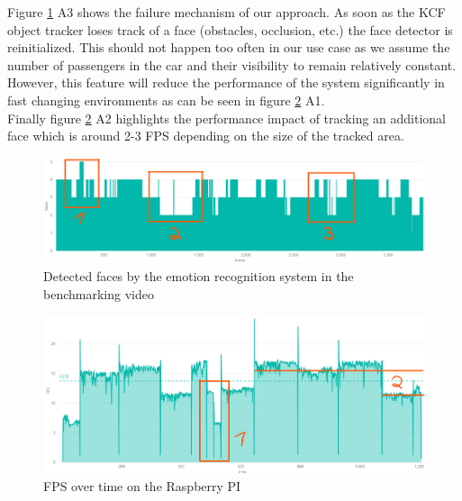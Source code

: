 Figure \ref{fig:edaccuracy} A3 shows the failure mechanism of our approach. As soon as the KCF object tracker loses track of a face (obstacles, occlusion, etc.) the face detector is reinitialized. This should not happen too often in our use case as we assume the number of passengers in the car and their visibility to remain relatively constant. However, this feature will reduce the performance of the system significantly in fast changing environments as can be seen in figure \ref{fig:edfps} A1.\\
Finally figure \ref{fig:edfps} A2 highlights the performance impact of tracking an additional face which is around 2-3 FPS depending on the size of the tracked area.\\
\begin{figure}[H]
\centering
\includegraphics[width=\columnwidth]{media/diagram_ed_accuracy.png}
\caption{Detected faces by the emotion recognition system in the benchmarking video}
\label{fig:edaccuracy}
\end{figure}
\begin{figure}[H]
  \centering
  \includegraphics[width=\columnwidth]{media/diagram_ed_FPS_time.png}
  \caption{FPS over time on the Raspberry PI}
  \label{fig:edfps}
\end{figure}